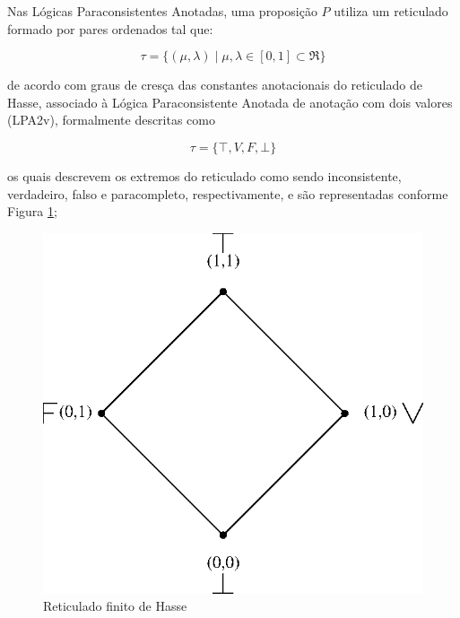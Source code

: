 Nas Lógicas Paraconsistentes Anotadas, uma proposição $P$ utiliza um reticulado formado por pares ordenados tal que: 

\begin{center}
\begin{equation}
\tau = \{ ( \mu , \lambda ) \mid \mu ,\lambda \in [0,1] \subset \Re \}
\end{equation}
\end{center}

de acordo com graus de cresça das constantes anotacionais do reticulado de Hasse, 
associado à Lógica Paraconsistente Anotada de anotação com dois valores (LPA2v), 
formalmente descritas como 

\begin{center}
\begin{equation}
  \tau = \{ \top , V, F, \bot \}
\end{equation}
\end{center}

os quais descrevem os extremos do reticulado como sendo 
inconsistente,%
verdadeiro, %
falso e %
paracompleto,%
respectivamente, e são representadas conforme Figura \ref{fig:reticuladoHasse}; 

\begin{figure}[!htb]
\center\includegraphics[scale=1.0]{./pic/C421reticuladoHasse.eps}
\caption{Reticulado finito de Hasse}
\label{fig:reticuladoHasse}
\end{figure}

